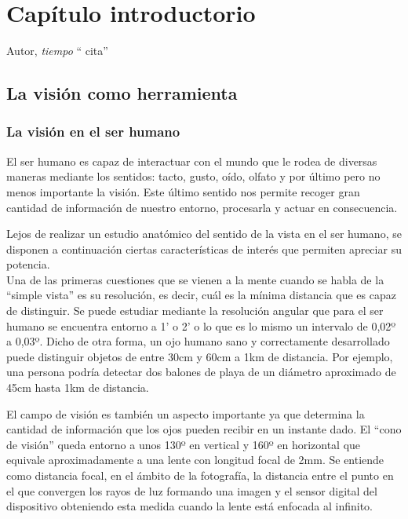 \chapter{ Capítulo introductorio}

\begin{chapquote}{Autor, \textit{tiempo}}
`` cita''
\end{chapquote}

\section{La visión como herramienta}
\subsection{La visión en el ser humano}
El ser humano es capaz de interactuar con el mundo que le rodea de diversas maneras mediante los sentidos: tacto, gusto, oído, olfato y por último pero no menos importante la visión. Este último sentido nos permite recoger gran cantidad de información de nuestro entorno, procesarla y actuar en consecuencia. 

Lejos de realizar un estudio anatómico del sentido de la vista en el ser humano, se disponen a continuación ciertas características de interés que permiten apreciar su potencia.
\\
Una de las primeras cuestiones que se vienen a la mente cuando se habla de la ``simple vista'' es su resolución, es decir, cuál es la mínima distancia que es capaz de distinguir. Se puede estudiar mediante la resolución angular que para el ser humano se encuentra entorno a 1' o 2' o lo que es lo mismo un intervalo de 0,02º a 0,03º\cite{simple_vista}. Dicho de otra forma, un ojo humano sano y correctamente desarrollado puede distinguir objetos de entre 30cm y 60cm a 1km de distancia. Por ejemplo, una persona podría detectar dos balones de playa de un diámetro aproximado de 45cm hasta 1km de distancia.


El campo de visión es también un aspecto importante ya que determina la cantidad de información que los ojos pueden recibir en un instante dado. El ``cono de visión'' queda entorno a unos 130º en vertical y 160º en horizontal que equivale aproximadamente a una lente con longitud focal de 2mm\cite{angle_of_view}. Se entiende como distancia focal, en el ámbito de la fotografía, la distancia entre el punto en el que convergen los rayos de luz formando una imagen y el sensor digital del dispositivo obteniendo esta medida cuando la lente está enfocada al infinito.

